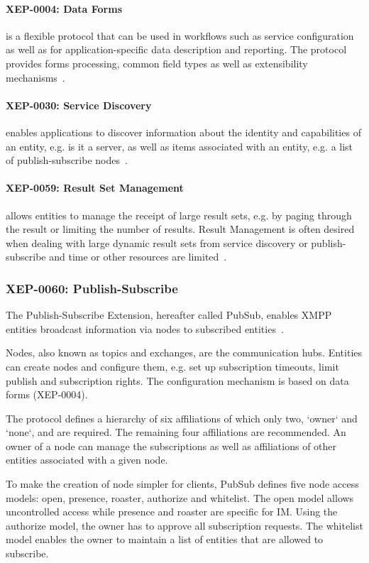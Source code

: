 \paragraph{XEP-0004: Data Forms} is a flexible protocol that can be used in workflows such as service configuration as well as for application-specific data description and reporting. The protocol provides forms processing, common field types as well as extensibility mechanisms~\cite{xep-0004}.

\paragraph{XEP-0030: Service Discovery} enables applications to discover information about the identity and capabilities of an entity, e.g. is it a server, as well as items associated with an entity, e.g. a list of publish-subscribe nodes~\cite{xep-0030}.

\paragraph{XEP-0059: Result Set Management} allows entities to manage the receipt of large result sets, e.g. by paging through the result or limiting the number of results. Result Management is often desired when dealing with large dynamic result sets from service discovery or publish-subscribe and time or other resources are limited~\cite{xep-0059}.

\subsubsection{XEP-0060: Publish-Subscribe}
The Publish-Subscribe Extension, hereafter called PubSub, enables XMPP entities broadcast information via nodes to subscribed entities~\cite{xep-0060}.

Nodes, also known as topics and exchanges, are the communication hubs. Entities can create nodes and configure them, e.g. set up subscription timeouts, limit publish and subscription rights. The configuration mechanism is based on data forms (XEP-0004).

The protocol defines a hierarchy of six affiliations of which only two, `owner` and `none`, and are required. The remaining four affiliations are recommended. An owner of a node can manage the subscriptions as well as affiliations of other entities associated with a given node. %

To make the creation of node simpler for clients, PubSub defines five node access models: open, presence, roaster, authorize and whitelist.
The open model allows uncontrolled access while presence and roaster are specific for IM. Using the authorize model, the owner has to approve all subscription requests. The whitelist model enables the owner to maintain a list of entities that are allowed to subscribe.

